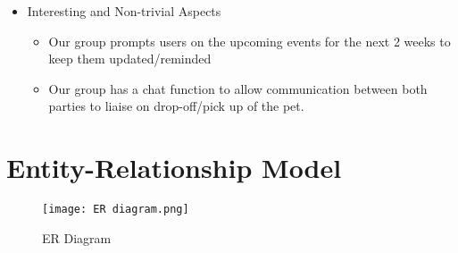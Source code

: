 \documentclass[10pt]{article}
\begin{document}
\begin{itemize}
    \item Interesting and Non-trivial Aspects
    \begin{itemize}
        \item Our group prompts users on the upcoming events for the next 2 weeks to keep them updated/reminded
        \item Our group has a chat function to allow communication between both parties to liaise on drop-off/pick up of the pet.
    \end{itemize}
    
\end{itemize}

\newpage


\section{Entity-Relationship Model}
\begin{figure}[htp]
    \centering
    \texttt{[image: ER diagram.png]}
    \caption{ER Diagram}
\end{figure}
\end{document}
